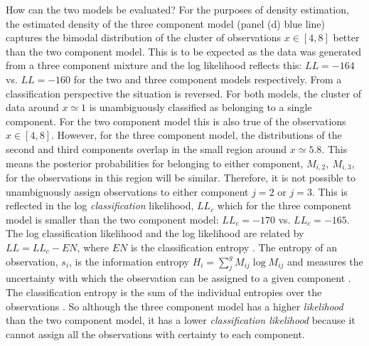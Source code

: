 How can the two models be evaluated?  For the purposes of density estimation, the estimated density of the three component model (panel (d) blue line) captures the bimodal distribution of the cluster of observations $x \in [4, 8]$ better than the two component model. This is to be expected as the data was generated from a three component mixture and the log likelihood reflects this: $LL=\num{-164}$ vs. $LL=\num{-160}$ for the two and three component models respectively. From a classification perspective the situation is reversed. For both models, the cluster of data around $x\simeq 1$ is unambiguously classified as belonging to a single component. For the two component model this is also true of the observations $x  \in [4, 8]$. However, for the three component model, the  distributions of the second and third components overlap in the small region around $x\simeq 5.8$. This means the posterior probabilities for belonging to either component, $M_{i, 2},\ M_{i, 3}$,  for the observations in this region will be similar. Therefore, it is not possible to unambiguously assign observations to either component $j=2$ or $j=3$. This is reflected in the log \emph{classification} likelihood, $LL_{c}$ which for the three component model is smaller than the two component model: $LL_{c}=\num{-170}$ vs. $LL_{c} = \num{-165}$. The log classification likelihood and the log likelihood are related by $LL = LL_{c} - EN$, where $EN$ is the classification entropy \cite{hathaway1986another}.  The entropy of an observation, $s_i$, is the information entropy  $H_i = \sum_{j}^{g}M_{ij}\log{M_{ij}}$  and measures the uncertainty with which the observation can be assigned to a given component \cite{mackay2003information}. The classification entropy is the sum of the individual entropies over the observations \cite{mclachlanFiniteMixtureModels2000}. So although the three component model has a higher \emph{likelihood} than the two component model, it has a lower \emph{classification likelihood} because it cannot assign all the observations with certainty to each component. 


